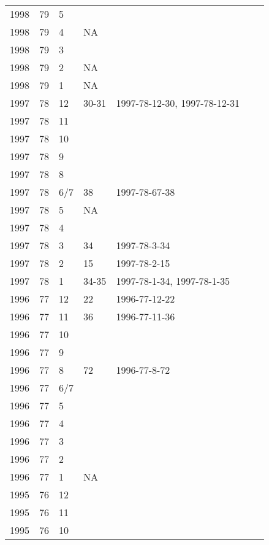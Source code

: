 \begin{longtable}{ |l|l|l|l|p{2.7cm}|l|p{2cm}| }
 1998 & 79 &     5 &         &  &  & \\
 1998 & 79 &     4 &     NA  &  &  & \\
 1998 & 79 &     3 &         &  &  & \\
 1998 & 79 &     2 &     NA  &  &  & \\
 1998 & 79 &     1 &     NA  &  &  & \\
 1997 & 78 &    12 &    30-31   & 1997-78-12-30, 1997-78-12-31  &  & \\
 1997 & 78 &    11 &         &  &  & \\
 1997 & 78 &    10 &         &  &  & \\
 1997 & 78 &     9 &         &  &  & \\
 1997 & 78 &     8 &         &  &  & \\
 1997 & 78 &   6/7 &    38   & 1997-78-67-38  &  & \\
 1997 & 78 &     5 &     NA  &  &  & \\
 1997 & 78 &     4 &         &  &  & \\
 1997 & 78 &     3 &    34   & 1997-78-3-34 &  & \\
 1997 & 78 &     2 &    15   & 1997-78-2-15  &  & \\
 1997 & 78 &     1 &   34-35 & 1997-78-1-34, 1997-78-1-35 &  & \\
 1996 & 77 &    12 &    22   & 1996-77-12-22 &  & \\
 1996 & 77 &    11 &    36   & 1996-77-11-36 &  & \\
 1996 & 77 &    10 &         &                &  & \\
 1996 & 77 &     9 &         &                &  & \\
 1996 & 77 &     8 &    72   & 1996-77-8-72 &  & \\
 1996 & 77 &   6/7 &         &                &  & \\
 1996 & 77 &     5 &         &                &  & \\
 1996 & 77 &     4 &         &                &  & \\
 1996 & 77 &     3 &         &                &  & \\
 1996 & 77 &     2 &         &                &  & \\
 1996 & 77 &     1 &     NA  &                &  & \\
 1995 & 76 &    12 &         &                &  & \\
 1995 & 76 &    11 &         &                &  & \\
 1995 & 76 &    10 &         &                &  & \\

\end{longtable}
